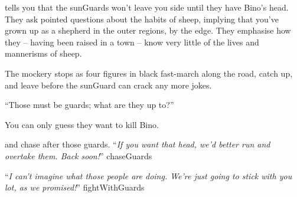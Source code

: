 tells you that the \glspl{sunGuard} won't leave you side until they have Bino's head.
They ask pointed questions about the habits of sheep, implying that you've grown up as a shepherd in the outer regions, by the \gls{edge}.
They emphasise how they -- having been raised in a town -- know very little of the lives and mannerisms of sheep.

The mockery stops as four figures in black fast-march along the road, catch up, and leave before the \gls{sunGuard} can crack any more jokes.

\begin{speechtext}
  ``Those must be \glspl{guard}; what are they up to?''
\end{speechtext}

You can only guess they want to kill Bino.

\begin{selectPath}
  {and chase after those \glspl{guard}.
  ``\textit{If you want that head, we'd better run and overtake them.
  Back soon!}''
  }%
  {chaseGuards}

  {``\textit{I can't imagine what those people are doing.
  We're just going to stick with you lot, as we promised!}''}%
  {fightWithGuards}
\end{selectPath}
